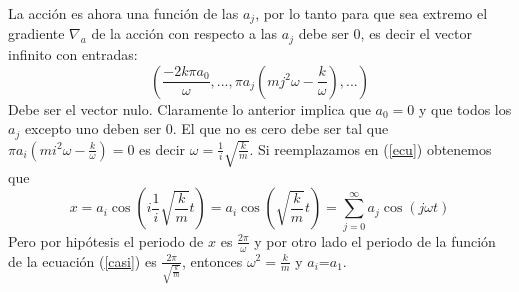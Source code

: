 \documentclass[letterpaper,10pt]{article}
\begin{document}
La acci\'on es ahora una funci\'on de las $a_j$, por lo tanto para que sea extremo el gradiente $\nabla_a$ de la acci\'on con respecto a las $a_j$ debe ser $0$, es decir el vector infinito con entradas:
\begin{equation}
\left( \frac{-2 k \pi a_0}{\omega},...,\pi a_j (m j^2 \omega-\frac{k}{ \omega}),... \right)
\end{equation}
Debe ser el vector nulo. Claramente lo anterior implica que $a_0=0$ y que todos los $a_j$ excepto uno deben ser 0. El que no es cero debe ser tal que $\pi a_i (m i^2 \omega-\frac{k}{ \omega})=0$ es decir $\omega=\frac{1}{i}\sqrt{\frac{k}{m}}$. Si reemplazamos en (\ref{ecu}) obtenemos que 
\begin{equation}
x=a_i \cos(i \frac{1}{i}\sqrt{\frac{k}{m}} t)=a_i \cos(\sqrt{\frac{k}{m}} t)= \sum_{j=0}^\infty a_j \cos(j \omega t)
\label{casi}
\end{equation}
Pero por hip\'otesis el periodo de $x$ es $\frac{2\pi}{\omega}$ y por otro lado el periodo de la funci\'on de la ecuaci\'on (\ref{casi}) es $\frac{2\pi}{\sqrt{\frac{k}{m}}}$, entonces $\omega^2=\frac{k}{m}$ y $a_i$=$a_1$.
\end{document}
